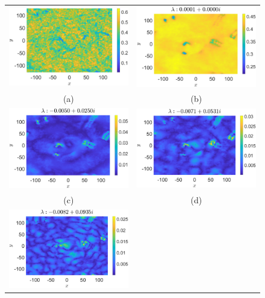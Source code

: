 \documentclass[a4paper,11pt]{article}
\begin{document}
\begin{figure}[!ht]
\centering
\begin{tabular}{cc}
\includegraphics[width=.51\textwidth]{amplitude_lfforce_K_256_Lx_128_tf_1pt5e4} &\hspace{-15pt} \includegraphics[width=.51\textwidth]{mean_lfforce_K_256_Lx_128_tf_1_pt5e4} \\
(a) & (b)\\
\includegraphics[width=.51\textwidth]{osc1_lfforce_K_256_Lx_128_tf_1_pt5e4} &\hspace{-15pt} \includegraphics[width=.51\textwidth]{osc2_lfforce_K_256_Lx_128_tf_1_pt5e4} \\
(c) & (d)\\
\includegraphics[width=.51\textwidth]{osc3_lfforce_K_256_Lx_128_tf_1_pt5e4} & \\

\end{tabular}
\end{figure}
\end{document}

